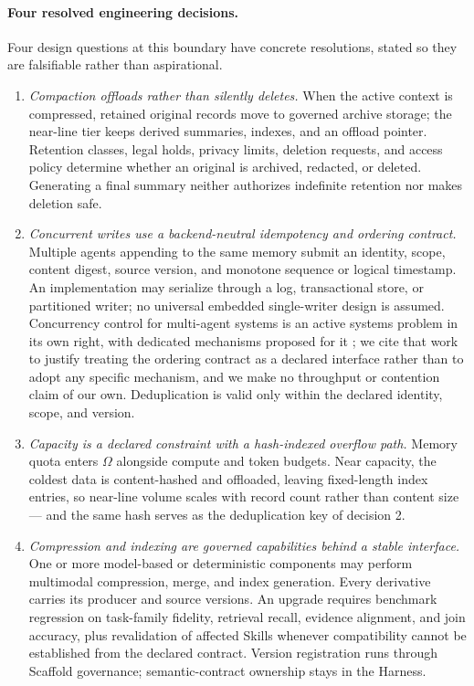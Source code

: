 \documentclass[11pt]{article}
\begin{document}
\paragraph{Four resolved engineering decisions.}
Four design questions at this boundary have concrete resolutions, stated so they are falsifiable rather than aspirational.
\begin{enumerate}
\item \textit{Compaction offloads rather than silently deletes.} When the active context is compressed, retained original records move to governed archive storage; the near-line tier keeps derived summaries, indexes, and an offload pointer. Retention classes, legal holds, privacy limits, deletion requests, and access policy determine whether an original is archived, redacted, or deleted. Generating a final summary neither authorizes indefinite retention nor makes deletion safe.
\item \textit{Concurrent writes use a backend-neutral idempotency and ordering contract.} Multiple agents appending to the same memory submit an identity, scope, content digest, source version, and monotone sequence or logical timestamp. An implementation may serialize through a log, transactional store, or partitioned writer; no universal embedded single-writer design is assumed. Concurrency control for multi-agent systems is an active systems problem in its own right, with dedicated mechanisms proposed for it \cite{lyu2026coagent}; we cite that work to justify treating the ordering contract as a declared interface rather than to adopt any specific mechanism, and we make no throughput or contention claim of our own. Deduplication is valid only within the declared identity, scope, and version.
\item \textit{Capacity is a declared constraint with a hash-indexed overflow path.} Memory quota enters $\Omega$ alongside compute and token budgets. Near capacity, the coldest data is content-hashed and offloaded, leaving fixed-length index entries, so near-line volume scales with record count rather than content size --- and the same hash serves as the deduplication key of decision 2.
\item \textit{Compression and indexing are governed capabilities behind a stable interface.} One or more model-based or deterministic components may perform multimodal compression, merge, and index generation. Every derivative carries its producer and source versions. An upgrade requires benchmark regression on task-family fidelity, retrieval recall, evidence alignment, and join accuracy, plus revalidation of affected Skills whenever compatibility cannot be established from the declared contract. Version registration runs through Scaffold governance; semantic-contract ownership stays in the Harness.
\end{enumerate}
\end{document}
